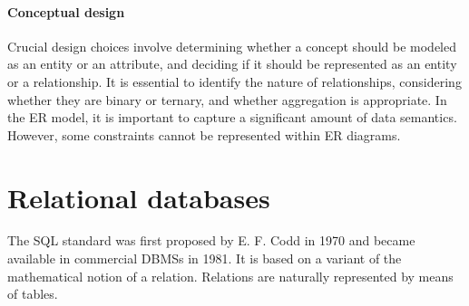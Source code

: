 \paragraph*{Conceptual design}
Crucial design choices involve determining whether a concept should be modeled as an entity or an attribute, and deciding if it should be represented as an entity or a relationship.
It is essential to identify the nature of relationships, considering whether they are binary or ternary, and whether aggregation is appropriate.
In the ER model, it is important to capture a significant amount of data semantics. 
However, some constraints cannot be represented within ER diagrams.

\section{Relational databases}
The SQL standard was first proposed by E. F. Codd in 1970 and became available in commercial DBMSs in 1981. It is based on a variant of the mathematical notion of a relation. 
Relations are naturally represented by means of tables.

